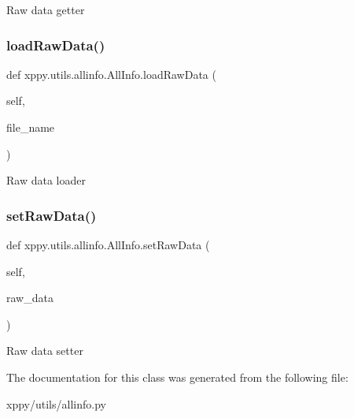 \begin{DoxyVerb}Raw data getter
\end{DoxyVerb}
 \mbox{\label{classxppy_1_1utils_1_1allinfo_1_1_all_info_a8d7628fd3cb953454ed1ab71bcac0a97}} 
\subsubsection{\texorpdfstring{load\+Raw\+Data()}{loadRawData()}}
{\footnotesize\ttfamily def xppy.\+utils.\+allinfo.\+All\+Info.\+load\+Raw\+Data (\begin{DoxyParamCaption}\item[{}]{self,  }\item[{}]{file\+\_\+name }\end{DoxyParamCaption})}

\begin{DoxyVerb}Raw data loader
\end{DoxyVerb}
 \mbox{\label{classxppy_1_1utils_1_1allinfo_1_1_all_info_accfdfbcb84c9f5f743d989dd1f442137}} 
\subsubsection{\texorpdfstring{set\+Raw\+Data()}{setRawData()}}
{\footnotesize\ttfamily def xppy.\+utils.\+allinfo.\+All\+Info.\+set\+Raw\+Data (\begin{DoxyParamCaption}\item[{}]{self,  }\item[{}]{raw\+\_\+data }\end{DoxyParamCaption})}

\begin{DoxyVerb}Raw data setter
\end{DoxyVerb}
 

The documentation for this class was generated from the following file\+:\begin{DoxyCompactItemize}
\item 
xppy/utils/allinfo.\+py\end{DoxyCompactItemize}

